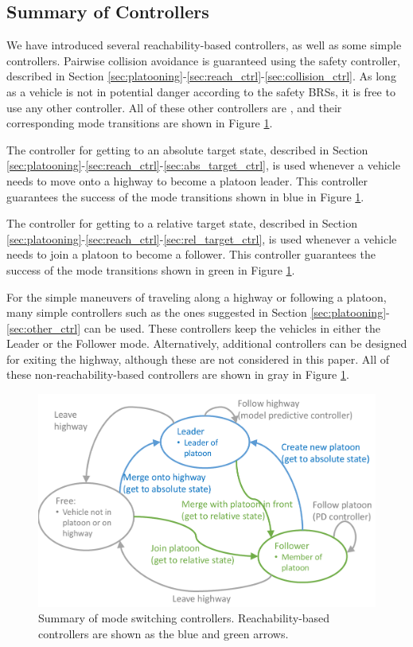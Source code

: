 \subsection{Summary of Controllers}
We have introduced several reachability-based controllers, as well as some simple controllers. Pairwise collision avoidance is guaranteed using the safety controller, described in Section \ref{sec:platooning}-\ref{sec:reach_ctrl}-\ref{sec:collision_ctrl}. As long as a vehicle is not in potential danger according to the safety BRSs, it is free to use any other controller. All of these other controllers are , and their corresponding mode transitions are shown in Figure \ref{fig:modeControllers}.

The controller for getting to an absolute target state, described in Section \ref{sec:platooning}-\ref{sec:reach_ctrl}-\ref{sec:abs_target_ctrl}, is used whenever a vehicle needs to move onto a highway to become a platoon leader. This controller guarantees the success of the mode transitions shown in blue in Figure \ref{fig:modeControllers}.

The controller for getting to a relative target state, described in Section \ref{sec:platooning}-\ref{sec:reach_ctrl}-\ref{sec:rel_target_ctrl}, is used whenever a vehicle needs to join a platoon to become a follower. This controller guarantees the success of the mode transitions shown in green in Figure \ref{fig:modeControllers}.

For the simple maneuvers of traveling along a highway or following a platoon, many simple controllers such as the ones suggested in Section \ref{sec:platooning}-\ref{sec:other_ctrl} can be used. These controllers keep the vehicles in either the Leader or the Follower mode. Alternatively, additional controllers can be designed for exiting the highway, although these are not considered in this paper. All of these non-reachability-based controllers are shown in gray in Figure \ref{fig:modeControllers}.

\begin{figure}
	\centering
	\includegraphics[width=0.75\columnwidth]{"fig/modeControllers"}
	\caption{Summary of mode switching controllers. Reachability-based controllers are shown as the blue and green arrows.}
	\label{fig:modeControllers}
\end{figure}